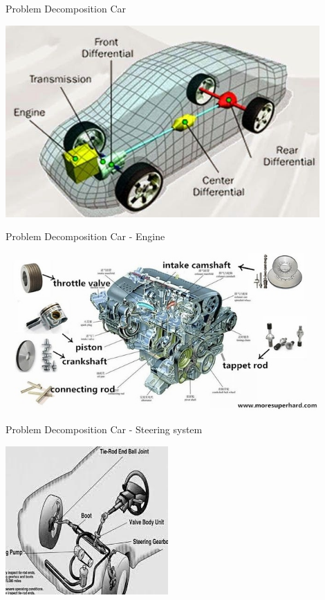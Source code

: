 \documentclass{beamer}
\begin{document}
\begin{frame}[fragile]{Problem Decomposition}
{Car}

\begin{center}
\includegraphics[width=0.9\textwidth]{images/car-parts-1.jpg}
\end{center}
\end{frame}

\begin{frame}[fragile]{Problem Decomposition}
{Car - Engine}

\begin{center}
\includegraphics[width=0.9\textwidth]{images/engine.jpeg}
\end{center}
\end{frame}


\begin{frame}[fragile]{Problem Decomposition}
{Car - Steering system}

\begin{center}
\includegraphics[height=0.7\textheight]{images/steering-system.jpeg}
\end{center}
\end{frame}
\end{document}
